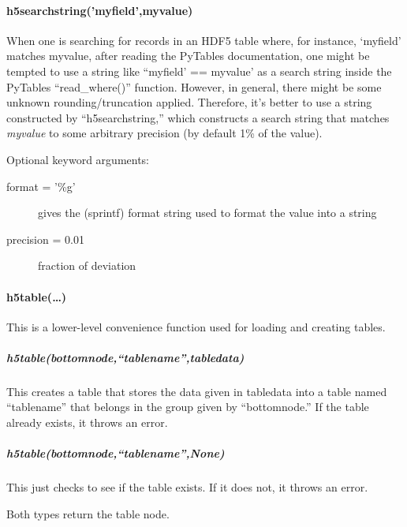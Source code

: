 \paragraph{h5searchstring('myfield',myvalue)}
When one is searching for records
    in an HDF5 table
    where, for instance,
    `myfield' matches myvalue,
    after reading the PyTables documentation,
    one might be tempted 
    to use a string like ``myfield' == myvalue'
    as a search string inside the PyTables ``read\_where()''
    function.
However, in general,
    there might be some unknown rounding/truncation applied.
Therefore, it's better to use a string constructed by ``h5searchstring,''
    which constructs a search string
    that matches \textit{myvalue}
    to some arbitrary precision (by default 1\% of the value).

Optional keyword arguments:
\begin{mykwargs}
    \begin{description}
        \item[format = '\%g'] gives the (sprintf) format string used
            to format the value into a string
        \item[precision = 0.01] fraction of deviation 
    \end{description}
\end{mykwargs}
\paragraph{h5table(\ldots)}
This is a lower-level convenience function used for
    loading and creating tables.
    
\subparagraph{h5table(bottomnode,``tablename'',tabledata)}
This creates a table that stores the data given in tabledata
    into a table named ``tablename'' that belongs in the group given
    by ``bottomnode.''
If the table already exists, it throws an error.

\subparagraph{h5table(bottomnode,``tablename'',None)}
This just checks to see if the table exists.
If it does not, it throws an error.

Both types return the table node.

